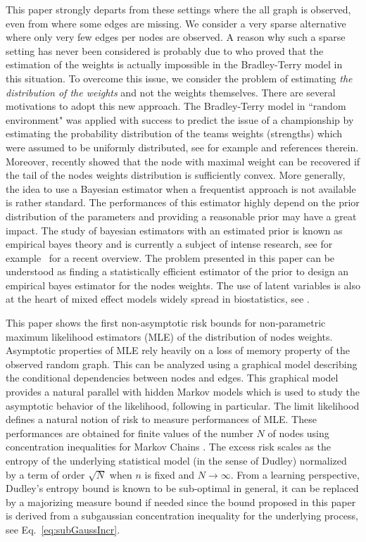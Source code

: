This paper strongly departs from these settings where the all graph is observed, even from \cite{YanYangXu:2011} where some edges are missing. 
We consider a very sparse alternative where only very few edges per nodes are observed.
A reason why such a sparse setting has never been considered is probably due to \cite{zemerlo:1929} who proved that the estimation of the weights is actually impossible in the Bradley-Terry model in this situation. 
To overcome this issue, we consider the problem of estimating \emph{the distribution of the weights} and not the weights themselves. 
There are several motivations to adopt this new approach. 
The Bradley-Terry model in ``random environment"  was applied with success to predict the issue of a championship by estimating the probability distribution of the teams weights (strengths) which were assumed to be uniformly distributed, see for example \cite{Sir_Red:2009} and references therein. 
Moreover, \cite{CheDielLer:2017} recently showed that the node with maximal weight can be recovered if the tail of the nodes weights distribution is sufficiently convex. 
More generally, the idea to use a Bayesian estimator when a frequentist approach is not available is rather standard. 
The performances of this estimator highly depend on the prior distribution of the parameters and providing a reasonable prior may have a great impact. 
The study of bayesian estimators with an estimated prior is known as empirical bayes theory \cite{MR0084919} and is currently a subject of intense research, see for example~\cite{MR2724758} for a recent overview. 
The problem presented in this paper can be understood as finding a statistically efficient estimator of the prior to design an empirical bayes estimator for the nodes weights. 
The use of latent variables is also at the heart of mixed effect models widely spread in biostatistics, see \cite{MR3331127}. 

This paper shows the first non-asymptotic risk bounds for non-parametric maximum likelihood estimators (MLE) of the distribution of nodes weights. 
Asymptotic properties of MLE rely heavily on a loss of memory property of the observed random graph. 
This can be analyzed using a graphical model describing the conditional dependencies between nodes and edges. 
This graphical model provides a natural parallel with hidden Markov models \cite{cappe:moulines:ryden:2005} which is used to study the asymptotic behavior of the likelihood, following \cite{DoucMoulines} in particular. 
The limit likelihood defines a natural notion of risk to measure performances of MLE. 
These performances are obtained for finite values of the number $N$ of nodes using concentration inequalities for Markov Chains \cite{dedecker:gouezel:2015}.
The excess risk scales as the entropy of the underlying statistical model (in the sense of Dudley) normalized by a term of order $\sqrt{N}$ when $n$ is fixed and $N\to\infty$. 
From a learning perspective, Dudley's entropy bound is known to be sub-optimal in general, it can be replaced by a majorizing measure bound \cite{Talagrand:2014} if needed since the bound proposed in this paper is derived from a subgaussian concentration inequality for the underlying process, see Eq.~\eqref{eq:subGaussIncr}. 

